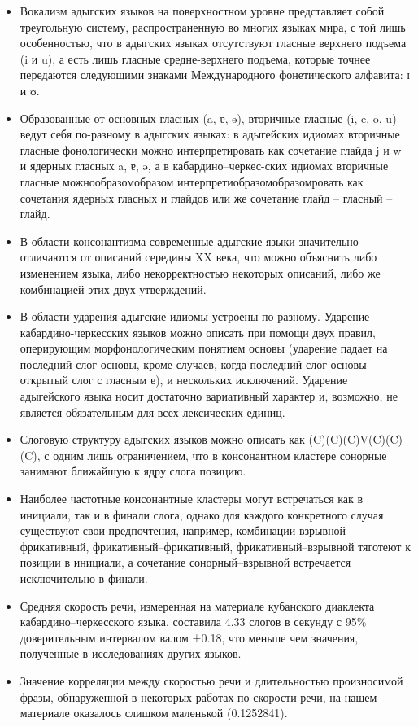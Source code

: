 \documentclass[russian,]{book}
\providecommand{\tightlist}{%
  \setlength{\itemsep}{0pt}\setlength{\parskip}{0pt}}
\begin{document}
\begin{itemize}
\tightlist
\item
  Вокализм адыгских языков на поверхностном уровне представляет собой
  треугольную систему, распространенную во многих языках мира, с той
  лишь особенностью, что в адыгских языках отсутствуют гласные верхнего
  подъема (i и u), а есть лишь гласные средне-верхнего подъема, которые
  точнее передаются следующими знаками Международного фонетического
  алфавита: ɪ и ʊ.
\item
  Образованные от основных гласных (a, ɐ, ə), вторичные гласные (i, e,
  o, u) ведут себя по-разному в адыгских языках: в адыгейских идиомах
  вторичные гласные фонологически можно интерпретировать как сочетание
  глайда j и w и ядерных гласных a, ɐ, ə, а в кабардино--черкес-ских
  идиомах вторичные гласные можнообразомобразом
  интерпретиобразомобразомровать как сочетания ядерных гласных и глайдов
  или же сочетание глайд -- гласный -- глайд.
\item
  В области консонантизма современные адыгские языки значительно
  отличаются от описаний середины XX века, что можно объяснить либо
  изменением языка, либо некорректностью некоторых описаний, либо же
  комбинацией этих двух утверждений.
\item
  В области ударения адыгские идиомы устроены по-разному. Ударение
  кабардино-черкесских языков можно описать при помощи двух правил,
  оперирующим морфонологическим понятием основы (ударение падает на
  последний слог основы, кроме случаев, когда последний слог основы ---
  открытый слог с гласным ɐ), и нескольких исключений. Ударение
  адыгейского языка носит достаточно вариативный характер и, возможно,
  не является обязательным для всех лексических единиц.
\item
  Слоговую структуру адыгских языков можно описать как
  (C)(C)(C)V(C)(C)(C), с одним лишь ограничением, что в консонантном
  кластере сонорные занимают ближайшую к ядру слога позицию.
\item
  Наиболее частотные консонантные кластеры могут встречаться как в
  инициали, так и в финали слога, однако для каждого конкретного случая
  существуют свои предпочтения, например, комбинации
  взрывной--фрикативный, фрикативный--фрикативный, фрикативный--взрывной
  тяготеют к позиции в инициали, а сочетание сонорный--взрывной
  встречается исключительно в финали.
\item
  Средняя скорость речи, измеренная на материале кубанского диаклекта
  кабардино--черкесского языка, составила 4.33 слогов в секунду с 95\%
  доверительным интервалом валом ±0.18, что меньше чем значения,
  полученные в исследованиях других языков.
\item
  Значение корреляции между скоростью речи и длительностью произносимой
  фразы, обнаруженной в некоторых работах по скорости речи, на нашем
  материале оказалось слишком маленькой (0.1252841).
\end{itemize}
\end{document}
